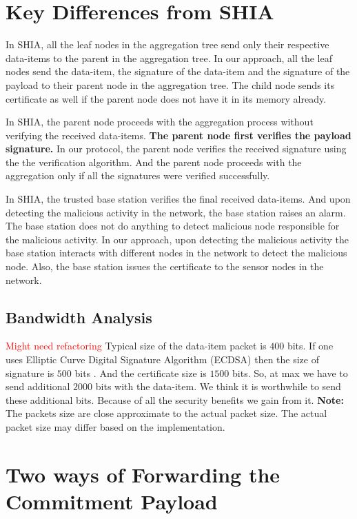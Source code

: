 \section{Key Differences from SHIA}

	In SHIA, all the leaf nodes in the aggregation tree send only their respective data-items to the parent in the aggregation tree.
	In our approach, all the leaf nodes send the data-item, the signature of the data-item and the signature of the payload to their parent node in the aggregation tree. 
	The child node sends its certificate as well if the parent node does not have it in its memory already.

	In SHIA, the parent node proceeds with the aggregation process without verifying the received data-items.
	\textbf{The parent node first verifies the payload signature.}
	In our protocol, the parent node verifies the received signature using the the verification algorithm.
	And the parent node proceeds with the aggregation only if all the signatures were verified successfully.

	In SHIA, the trusted base station verifies the final received data-items.
	And upon detecting the malicious activity in the network, the base station raises an alarm. 
	The base station does not do anything to detect malicious node responsible for the malicious activity.
	In our approach, upon detecting the malicious activity the base station interacts with different nodes in the network to detect the malicious node.
	Also, the  base station issues the certificate to the sensor nodes in the network.
	
	\subsection{Bandwidth Analysis}
	
		\textcolor{red}{Might need refactoring}
		Typical size of the data-item packet is $400$ bits.
		If one uses Elliptic Curve Digital Signature Algorithm (ECDSA) then the size of signature is $500$ bits \cite{ecdsa2009186}.
		And the certificate size is $1500$ bits.
		So, at max we have to send additional $2000$ bits with the data-item.
		We think it is worthwhile to send these additional bits.
		Because of all the security benefits we gain from it. 
		\textbf{Note:} The packets size are close approximate to the actual packet size. 
		The actual packet size may differ based on the implementation.

\section{Two ways of Forwarding the Commitment Payload}	
	
